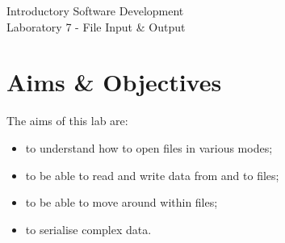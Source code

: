 \documentclass[12pt,oneside]{cttutorial}
\begin{document}
\tutorialextra{}


 

\newcommand{\xkcd}[2]{
	\begin{center}
	\texttt{[image: ../../Figures/png/\#1]}
	\newline
	\url{http://xkcd.com/#2}
	\end{center}
	\bigskip
}

\newcommand{\alert}[1]
{\marginpar
  {\makebox[0 pt][l]
    {\texttt{[image: ../../Figures/png/warning.png]}
  }
  \parbox{2 cm}{{\sffamily \bfseries \tiny #1}}}}


\renewcommand{\baselinestretch}{1.5}
\textwidth=15cm

\newcommand{\I}{j}

\begin{center}
\begin{bfseries}
Introductory Software Development\\Laboratory 7 - File Input \& Output
\end{bfseries}
\end{center}

\section{Aims \& Objectives}

The aims of this lab are:

\begin{itemize}
\item to understand how to open files in various modes;
\item to be able to read and write data from and to files;
\item to be able to move around within files;
\item to serialise complex data.
\end{itemize}
\end{document}
